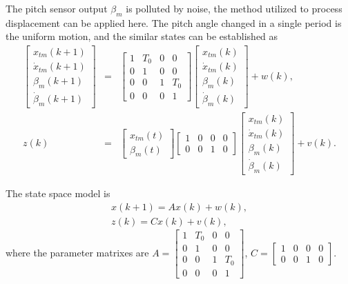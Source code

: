 \documentclass{article}
\begin{document}
The pitch sensor output $\beta_m$ is polluted by noise, the method
utilized to process displacement can be applied here. The pitch
angle changed in a single period is the uniform motion, and the similar
states can be established as
\begin{eqnarray}
  \begin{bmatrix}
    x_{tm}(k+1) \\
    \dot{x}_{tm}(k+1) \\
    \beta_m(k+1) \\
    \dot{\beta}_m(k+1)
  \end{bmatrix}
  &=&
  \begin{bmatrix}
    1 & T_0 & 0 & 0 \\
    0 & 1 & 0 & 0 \\
    0 & 0 & 1 & T_0 \\
    0 & 0 & 0 & 1
  \end{bmatrix}
  \begin{bmatrix}
    x_{tm}(k) \\
    \dot{x}_{tm}(k) \\
    \beta_m(k) \\
    \dot{\beta}_m(k)
  \end{bmatrix} + w(k), \\
  z(k) &=&
  \begin{bmatrix}
    x_{tm}(t) \\
    \beta_m(t)
  \end{bmatrix}
  \begin{bmatrix}
    1 & 0 & 0 & 0 \\
    0 & 0 & 1 & 0
  \end{bmatrix}
  \begin{bmatrix}
    x_{tm}(k) \\
    \dot{x}_{tm}(k) \\
    \beta_m(k) \\
    \dot{\beta}_m(k)
  \end{bmatrix} + v(k).
\end{eqnarray}

The state space model is
\begin{eqnarray}
  x(k+1) = Ax(k) + w(k), \\
  z(k) = C x(k) + v(k),
\end{eqnarray}
where the parameter matrixes are
$  A = \begin{bmatrix}
    1 & T_0 & 0 & 0 \\
    0 & 1 & 0 & 0 \\
    0 & 0 & 1 & T_0 \\
    0 & 0 & 0 & 1
  \end{bmatrix}$,
  $C =   \begin{bmatrix}
    1 & 0 & 0 & 0 \\
    0 & 0 & 1 & 0
  \end{bmatrix}$.
\end{document}
